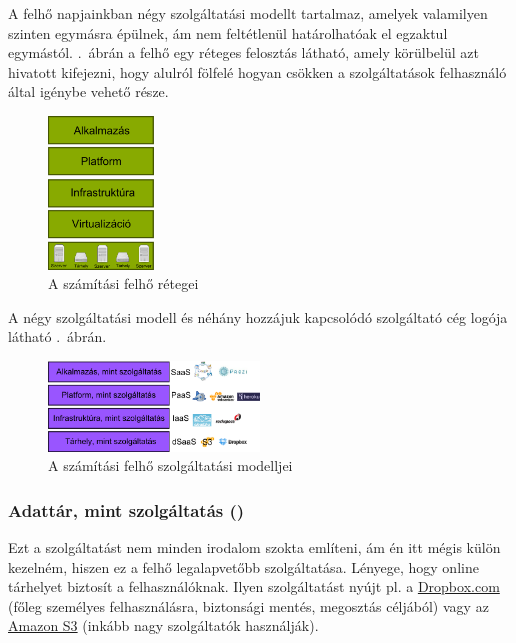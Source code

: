 A felhő napjainkban négy szolgáltatási modellt tartalmaz, amelyek valamilyen szinten egymásra épülnek, ám nem feltétlenül határolhatóak el egzaktul egymástól. .~ábrán a felhő egy réteges felosztás látható, amely körülbelül azt hivatott kifejezni, hogy alulról fölfelé hogyan csökken a szolgáltatások felhasználó által igénybe vehető része.


\begin{figure}[h!]
\centering
\includegraphics[width=0.25\textwidth]{figures/cloud_retegek.png}
\caption{A számítási felhő rétegei \label{fig:cloud_retegek}}
\end{figure}

A négy szolgáltatási modell és néhány hozzájuk kapcsolódó szolgáltató cég logója látható .~ábrán.

\begin{figure}[h!]
\centering
\includegraphics[width=0.5\textwidth]{figures/cloud_service_models.png}
\caption{A számítási felhő szolgáltatási modelljei \label{fig:cloud_service_models}}
\end{figure}
 
\subsubsection{Adattár, mint szolgáltatás ()}
Ezt a szolgáltatást nem minden irodalom szokta említeni, ám én itt mégis külön kezelném, hiszen ez a felhő legalapvetőbb szolgáltatása. Lényege, hogy online tárhelyet biztosít a felhasználóknak. Ilyen szolgáltatást nyújt pl. a \href{http://www.dropbox.com}{Dropbox.com} (főleg személyes felhasználásra, biztonsági mentés, megosztás céljából) vagy az \href{https://aws.amazon.com/s3/}{Amazon S3} (inkább nagy szolgáltatók használják).

